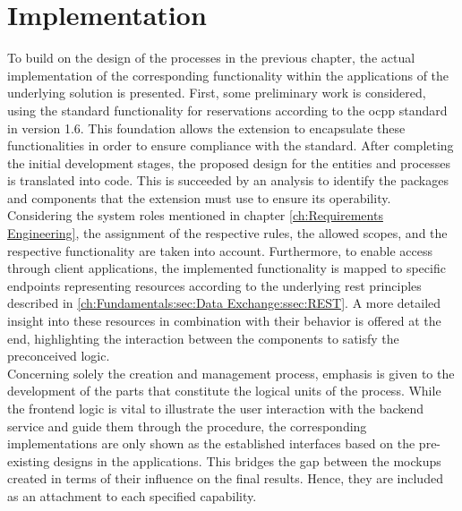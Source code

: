 
\chapter{Implementation}
\label{ch:Implementation}

To build on the design of the processes in the previous chapter, the actual implementation of the corresponding functionality within the applications of the underlying solution is presented.
First, some preliminary work is considered, using the standard functionality for reservations according to the \acrshort{ocpp} standard in version 1.6.
This foundation allows the extension to encapsulate these functionalities in order to ensure compliance with the standard.
After completing the initial development stages, the proposed design for the entities and processes is translated into code. This is succeeded by an analysis to identify the packages and components that the extension must use to ensure its operability.
Considering the system roles mentioned in chapter \ref{ch:Requirements Engineering}, the assignment of the respective rules, the allowed scopes, and the respective functionality are taken into account.
Furthermore, to enable access through client applications, the implemented functionality is mapped to specific endpoints representing resources according to the underlying \acrshort{rest} principles described in \ref{ch:Fundamentals:sec:Data Exchange:ssec:REST}.
A more detailed insight into these resources in combination with their behavior is offered at the end, highlighting the interaction between the components to satisfy the preconceived logic. \\
\noindent Concerning solely the creation and management process, emphasis is given to the development of the parts that constitute the logical units of the process. 
While the frontend logic is vital to illustrate the user interaction with the backend service and guide them through the procedure, the corresponding implementations are only shown as the established interfaces based on the pre-existing designs in the applications.
This bridges the gap between the mockups created in terms of their influence on the final results. Hence, they are included as an attachment to each specified capability. 
